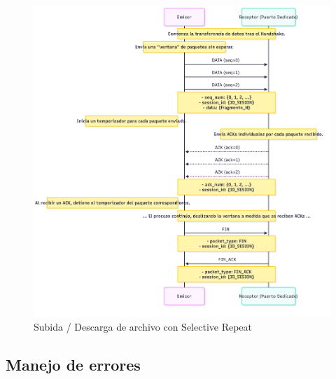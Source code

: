 \begin{figure}[H]
    \centering
    \includegraphics[height=0.8\textheight]{images/UPLOAD_DOWNLOAD_SR}
    \caption{Subida / Descarga de archivo con Selective Repeat}
    \label{fig:upload_download_sr}
\end{figure}

\subsection{Manejo de errores}

